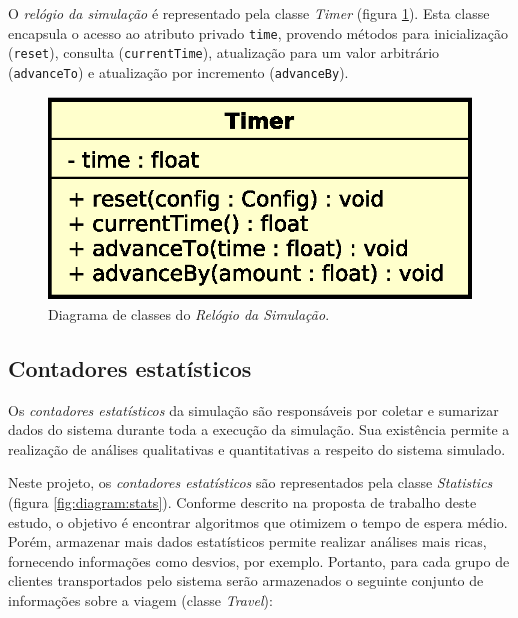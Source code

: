 O \textit{relógio da simulação} é representado pela classe \textit{Timer}
(figura \ref{fig:diagram:timer}). Esta classe encapsula o acesso ao atributo
privado \texttt{time}, provendo métodos para inicialização (\texttt{reset}),
consulta (\texttt{currentTime}), atualização para um valor arbitrário
(\texttt{advanceTo}) e atualização por incremento (\texttt{advanceBy}).

\begin{figure}[htb!]
  \centering
  \includegraphics[scale=0.6]{img/Timer.eps}
  \caption{Diagrama de classes do \textit{Relógio da Simulação}.}
\label{fig:diagram:timer}
\end{figure}

\subsection{Contadores estatísticos}

Os \textit{contadores estatísticos} da simulação são responsáveis por coletar e
sumarizar dados do sistema durante toda a execução da simulação. Sua existência
permite a realização de análises qualitativas e quantitativas a respeito do
sistema simulado.

Neste projeto, os \textit{contadores estatísticos} são representados pela classe
\textit{Statistics} (figura \ref{fig:diagram:stats}). Conforme descrito na
proposta de trabalho deste estudo, o objetivo é encontrar algoritmos que
otimizem o tempo de espera médio. Porém, armazenar mais dados estatísticos
permite realizar análises mais ricas, fornecendo informações como desvios, por
exemplo. Portanto, para cada grupo de clientes transportados pelo sistema serão
armazenados o seguinte conjunto de informações sobre a viagem (classe
\textit{Travel}):

